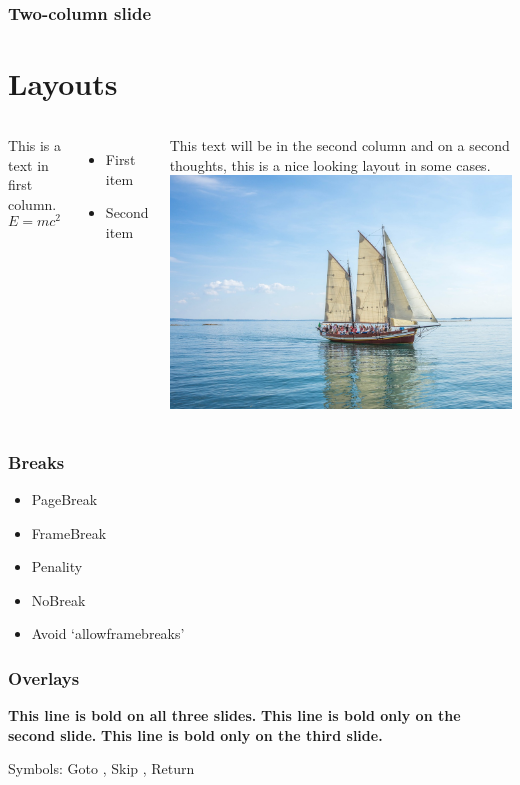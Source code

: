 \documentclass[12pt,[aspectratio=169]{beamer}
\begin{document}
\begin{frame}
    \frametitle{Two-column slide}
    \section{Layouts}
    \begin{columns}
        This is a text in first column.
        $$E=mc^2$$
        \begin{itemize}
        \item First item
        \item Second item
        \end{itemize}
        
        This text will be in the second column
        and on a second thoughts, this is a nice looking
        layout in some cases.
        \includegraphics[width=0.8\linewidth]{boat.jpg}
    \end{columns}
\end{frame}

\begin{frame}
    \frametitle{Breaks}
    \begin{itemize}
        \item PageBreak
        \item FrameBreak
        \break
        \item Penality
        \item NoBreak
        \nobreak
        \item Avoid `allowframebreaks'
    \end{itemize}

\end{frame}

\begin{frame}
    \frametitle{Overlays}
    \textbf{This line is bold on all three slides.}
    \textbf<2>{This line is bold only on the second slide.}
    \textbf<3>{This line is bold only on the third slide.}

    Symbols: Goto \insertgotosymbol, Skip \insertskipsymbol, Return \insertreturnsymbol
\end{frame}
\end{document}
